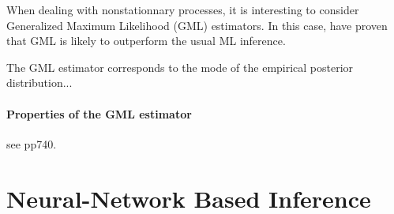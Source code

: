 \documentclass[11pt,a4paper,openany ]{book}
\begin{document}
When dealing with nonstationnary processes, it is interesting to consider Generalized Maximum Likelihood (GML) estimators. In this case, \cite{Adlouni_generalized_2007} have proven that GML is likely to outperform the usual ML inference.

The GML estimator corresponds to the mode of the empirical posterior distribution...

\paragraph*{Properties of the GML estimator} see pp740. \citet{martin_generalized_2000}

\section{Neural-Network Based Inference}
\end{document}
